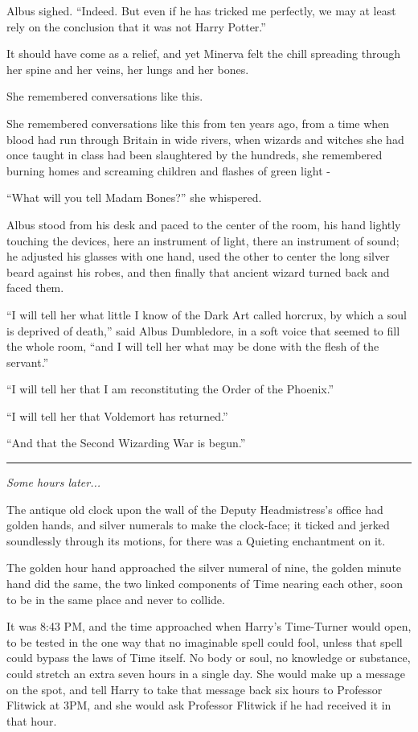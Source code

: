 Albus sighed. ``Indeed. But even if he has tricked me perfectly, we may
at least rely on the conclusion that it was not Harry Potter.''

It should have come as a relief, and yet Minerva felt the chill
spreading through her spine and her veins, her lungs and her bones.

She remembered conversations like this.

She remembered conversations like this from ten years ago, from a time
when blood had run through Britain in wide rivers, when wizards and
witches she had once taught in class had been slaughtered by the
hundreds, she remembered burning homes and screaming children and
flashes of green light -

``What will you tell Madam Bones?'' she whispered.

Albus stood from his desk and paced to the center of the room, his hand
lightly touching the devices, here an instrument of light, there an
instrument of sound; he adjusted his glasses with one hand, used the
other to center the long silver beard against his robes, and then
finally that ancient wizard turned back and faced them.

``I will tell her what little I know of the Dark Art called horcrux, by
which a soul is deprived of death,'' said Albus Dumbledore, in a soft
voice that seemed to fill the whole room, ``and I will tell her what may
be done with the flesh of the servant.''

``I will tell her that I am reconstituting the Order of the Phoenix.''

``I will tell her that Voldemort has returned.''

``And that the Second Wizarding War is begun.''

\begin{center}\rule{3in}{0.4pt}\end{center}

\emph{Some hours later...}

The antique old clock upon the wall of the Deputy Headmistress's office
had golden hands, and silver numerals to make the clock-face; it ticked
and jerked soundlessly through its motions, for there was a Quieting
enchantment on it.

The golden hour hand approached the silver numeral of nine, the golden
minute hand did the same, the two linked components of Time nearing each
other, soon to be in the same place and never to collide.

It was 8:43 PM, and the time approached when Harry's Time-Turner would
open, to be tested in the one way that no imaginable spell could fool,
unless that spell could bypass the laws of Time itself. No body or soul,
no knowledge or substance, could stretch an extra seven hours in a
single day. She would make up a message on the spot, and tell Harry to
take that message back six hours to Professor Flitwick at 3PM, and she
would ask Professor Flitwick if he had received it in that hour.

